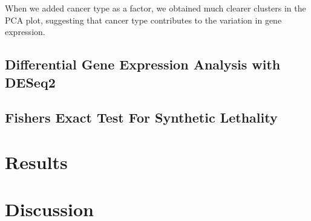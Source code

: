 \documentclass[10pt]{article}
\begin{document}
	When we added cancer type as a factor, we obtained much clearer clusters in the PCA plot, suggesting that cancer type contributes to the variation in gene expression. 
	
	
	

	\subsection{Differential Gene Expression Analysis with DESeq2}

	\subsection{Fishers Exact Test For Synthetic Lethality}

\section{Results}



\section{Discussion}




\end{document}

